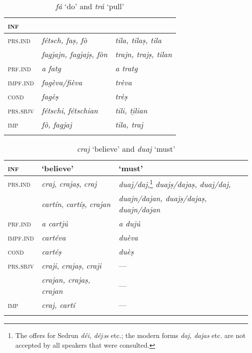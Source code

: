 \begin{table}
	\caption{\textit{fá} `do' and \textit{trá} `pull'}

	\begin{tabular}{lll}
		\lsptoprule
		\textsc{inf} & \isi{\textit{\textbf{fá}}} & \isi{\textit{\textbf{trá}}}\\
		\midrule
		\textsc{prs.ind} & \textit{fétsch, faṣ, fò} & \textit{tila, tilaṣ, tila}\\
		& \textit{fagjajn, fagjajṣ, fòn} & \textit{trajn, trajṣ, tilan}\\
		\textsc{prf.ind} & \textit{a fatg} & \textit{a tratg}\\
		\textsc{impf.ind} & \textit{fagèva/fièva} & \textit{trèva} \\
		\textsc{cond} & \textit{fagèṣ} & \textit{trèṣ}\\ 
		\textsc{prs.sbjv} & \textit{fétschi}, \textit{fétschian} & \textit{tili, ti̱lian}\\
		\textsc{imp} & \textit{fò, fagjaj} & \textit{tila, traj}\\
		\lspbottomrule
	\end{tabular}
\end{table}

\begin{table}
\small
	\caption{\textit{craj} `believe' and \textit{duaj} `must'}

	\begin{tabular}{lll}
		\lsptoprule
		\textsc{inf} & \isi{\textit{\textbf{craj}}} `believe' & \isi{\textit{\textbf{duaj}}} `must'\\
		\midrule
		\textsc{prs.ind} & \textit{craj}, \textit{crajaṣ}, \textit{craj} & \textit{duaj/daj},\footnote{The \DRG{4}{370} offers for Sedrun \textit{déi, déjǝs} etc.; the modern forms \textit{daj, dajas} etc. are not accepted by all speakers that were consulted.} \textit{duajṣ/dajaṣ, duaj/daj,}\\
		& \textit{cartín}, \textit{cartíṣ}, \textit{crajan} & \textit{duajn/dajan, duajṣ/dajaṣ, duajn/dajan}\\
		\textsc{prf.ind} & \textit{a cartjú} & \textit{a dujú}\\
		\textsc{impf.ind} & \textit{cartéva} & \textit{duèva} \\
		\textsc{cond} & \textit{cartéṣ} & \textit{duèṣ}\\
		\textsc{prs.sbjv} & \textit{craji}, \textit{crajaṣ}, \textit{craji} & --- \\
		&\textit{crajan, crajaṣ, crajan} & --- \\
		\textsc{imp} & \textit{craj, cartí} & --- \\
		\lspbottomrule
	\end{tabular}
\end{table}

